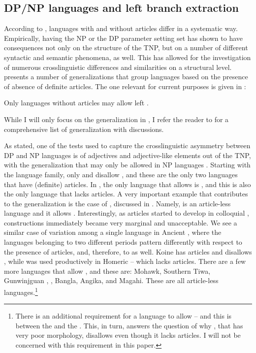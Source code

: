 \documentclass[output=paper,hidelinks,newtxmath,]{langscibook}
\begin{document}
\subsection{DP/NP languages and left branch extraction}\label{15:s3.2}

According to \citet{Boskovic2008,Boskovic2012}, languages with and without articles differ in a systematic way. Empirically, having the NP or the DP parameter setting set has shown to have consequences not only on the structure of the TNP, but on a number of different syntactic and semantic phenomena, as well. This has allowed for the investigation of numerous crosslinguistic differences and similarities on a structural level. \citet{Boskovic2008,Boskovic2012} presents a number of generalizations that group languages based on the presence of absence of definite articles. The one relevant for current purposes is given in :

\ea\label{15:ex1}
  Only languages without articles may allow left .
\z

\noindent While I will only focus on the generalization in , I refer the reader to \citet{Boskovic2008,Boskovic2012} for a comprehensive list of generalization with discussions.

As stated, one of the tests used to capture the crosslinguistic asymmetry between DP and NP languages is  of adjectives and adjective-like elements out of the TNP, with the generalization that  may only be allowed in NP languages \citet{Boskovic2008,Boskovic2012}. Starting with the  language family, only  and  disallow , and these are the only two languages that have (definite) articles. In , the only language that allows  is , and this is also the only  language that lacks articles. A very important example that contributes to the  generalization is the case of , discussed in \citet{Franks2007}. Namely,  is an article-less language and it allows . Interestingly, as articles started to develop in colloquial ,  constructions immediately became very marginal and unacceptable. We see a similar case of variation among a single language in Ancient , where the languages belonging to two different periods pattern differently with respect to the presence of articles, and, therefore, to  as well. Koine  has articles and disallows , while  was used productively in Homeric  – which lacks articles. There are a few more languages that allow , and these are: Mohawk, Southern Tiwa, Gunwinjguan \citep{Baker1996}, , Bangla, Angika, and Magahi. These are all article-less languages.\largerpage\footnote{\label{15:fn2}There is an additional requirement for a language to allow  -- and this is  between the  and the . This, in turn, answers the question of why , that has very poor  morphology, disallows  even though it lacks articles. I will not be concerned with this requirement in this paper.}
\end{document}
